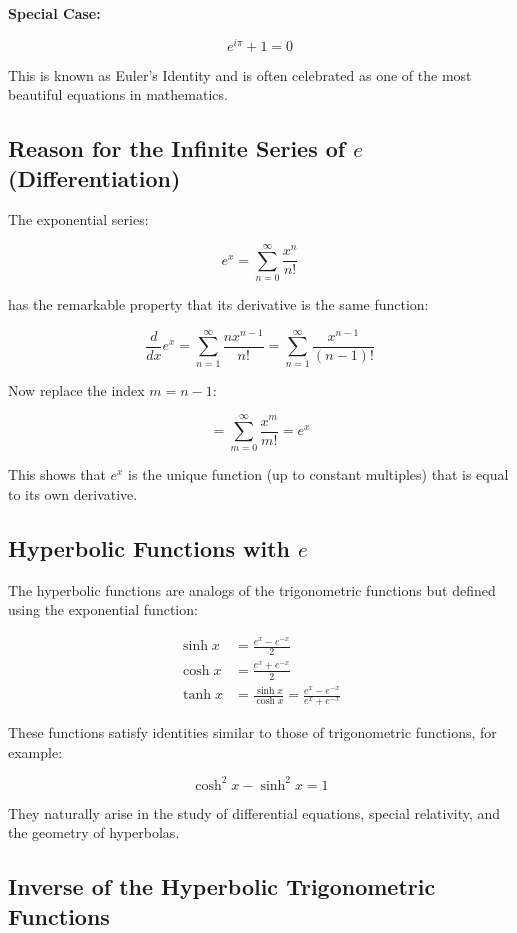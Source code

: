\textbf{Special Case:}

\[
    e^{i\pi} + 1 = 0
\]

This is known as Euler's Identity and is often celebrated as one of the most beautiful equations in 
mathematics.

\subsection{Reason for the Infinite Series of \texorpdfstring{\(e\)}{e} (Differentiation)}

The exponential series:

\[
    e^x = \sum_{n=0}^{\infty} \frac{x^n}{n!}
\]

has the remarkable property that its derivative is the same function:

\[
    \frac{d}{dx} e^x = \sum_{n=1}^{\infty} \frac{n x^{n-1}}{n!} = \sum_{n=1}^{\infty} \frac{x^{n-1}}{(n-1)!}
\]

Now replace the index \(m = n - 1\):

\[
    = \sum_{m=0}^{\infty} \frac{x^m}{m!} = e^x
\]

This shows that \(e^x\) is the unique function (up to constant multiples) that is equal to its own 
derivative.

\subsection{Hyperbolic Functions with \texorpdfstring{\(e\)}{e}}

The hyperbolic functions are analogs of the trigonometric functions but defined using the exponential 
function:

\begin{align*}
    \sinh x &= \frac{e^x - e^{-x}}{2} \\
    \cosh x &= \frac{e^x + e^{-x}}{2} \\
    \tanh x &= \frac{\sinh x}{\cosh x} = \frac{e^x - e^{-x}}{e^x + e^{-x}}
\end{align*}

These functions satisfy identities similar to those of trigonometric functions, for example:

\[
    \cosh^2 x - \sinh^2 x = 1
\]

They naturally arise in the study of differential equations, special relativity, and the 
geometry of hyperbolas.

\subsection{Inverse of the Hyperbolic Trigonometric Functions}


